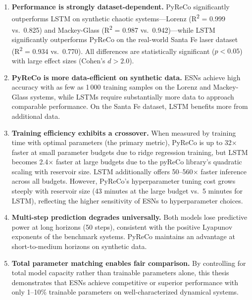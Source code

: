 \begin{enumerate}
    \item \textbf{Performance is strongly dataset-dependent.} PyReCo significantly outperforms LSTM on synthetic chaotic systems---Lorenz (R\textsuperscript{2} = 0.999 vs.\ 0.825) and Mackey-Glass (R\textsuperscript{2} = 0.987 vs.\ 0.942)---while LSTM significantly outperforms PyReCo on the real-world Santa Fe laser dataset (R\textsuperscript{2} = 0.934 vs.\ 0.770). All differences are statistically significant ($p < 0.05$) with large effect sizes (Cohen's $d > 2.0$).

    \item \textbf{PyReCo is more data-efficient on synthetic data.} ESNs achieve high accuracy with as few as 1\,000 training samples on the Lorenz and Mackey-Glass systems, while LSTMs require substantially more data to approach comparable performance. On the Santa Fe dataset, LSTM benefits more from additional data.

    \item \textbf{Training efficiency exhibits a crossover.} When measured by training time with optimal parameters (the primary metric), PyReCo is up to 32$\times$ faster at small parameter budgets due to ridge regression training, but LSTM becomes 2.4$\times$ faster at large budgets due to the pyReCo library's quadratic scaling with reservoir size. LSTM additionally offers 50--560$\times$ faster inference across all budgets. However, PyReCo's hyperparameter tuning cost grows steeply with reservoir size (43 minutes at the large budget vs.\ 5 minutes for LSTM), reflecting the higher sensitivity of ESNs to hyperparameter choices.

    \item \textbf{Multi-step prediction degrades universally.} Both models lose predictive power at long horizons (50 steps), consistent with the positive Lyapunov exponents of the benchmark systems. PyReCo maintains an advantage at short-to-medium horizons on synthetic data.

    \item \textbf{Total parameter matching enables fair comparison.} By controlling for total model capacity rather than trainable parameters alone, this thesis demonstrates that ESNs achieve competitive or superior performance with only 1--10\% trainable parameters on well-characterized dynamical systems.
\end{enumerate}

